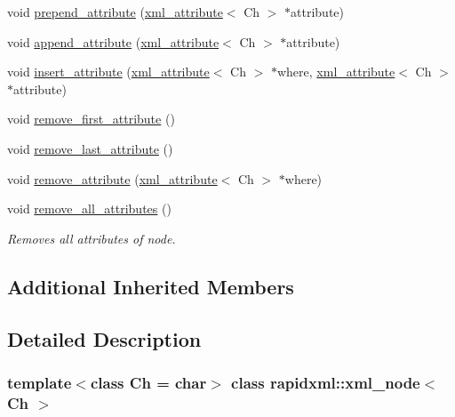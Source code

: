 \begin{DoxyCompactItemize}
void \mbox{\hyperlink{classrapidxml_1_1xml__node_a8b62ee76489faf8e2d1210869d547684}{prepend\+\_\+attribute}} (\mbox{\hyperlink{classrapidxml_1_1xml__attribute}{xml\+\_\+attribute}}$<$ Ch $>$ $\ast$attribute)
\item 
void \mbox{\hyperlink{classrapidxml_1_1xml__node_a33ce3386f8c42dd4db658b75cbb6e6c4}{append\+\_\+attribute}} (\mbox{\hyperlink{classrapidxml_1_1xml__attribute}{xml\+\_\+attribute}}$<$ Ch $>$ $\ast$attribute)
\item 
void \mbox{\hyperlink{classrapidxml_1_1xml__node_a9fe659cdf4a5b3bbf5e8ffc98db5a84f}{insert\+\_\+attribute}} (\mbox{\hyperlink{classrapidxml_1_1xml__attribute}{xml\+\_\+attribute}}$<$ Ch $>$ $\ast$where, \mbox{\hyperlink{classrapidxml_1_1xml__attribute}{xml\+\_\+attribute}}$<$ Ch $>$ $\ast$attribute)
\item 
void \mbox{\hyperlink{classrapidxml_1_1xml__node_aa95192d2a165cca16c551ed2a2a06aec}{remove\+\_\+first\+\_\+attribute}} ()
\item 
void \mbox{\hyperlink{classrapidxml_1_1xml__node_a1781a2cbedc9a51d609ad5b528125635}{remove\+\_\+last\+\_\+attribute}} ()
\item 
void \mbox{\hyperlink{classrapidxml_1_1xml__node_a6f97b1b4f46a94a4587915df3c0c6b57}{remove\+\_\+attribute}} (\mbox{\hyperlink{classrapidxml_1_1xml__attribute}{xml\+\_\+attribute}}$<$ Ch $>$ $\ast$where)
\item 
void \mbox{\hyperlink{classrapidxml_1_1xml__node_aa8d5d9484aa1eb5ff1841a073c84c1aa}{remove\+\_\+all\+\_\+attributes}} ()
\begin{DoxyCompactList}\small\item\em Removes all attributes of node. \end{DoxyCompactList}\end{DoxyCompactItemize}
\subsection*{Additional Inherited Members}


\subsection{Detailed Description}
\subsubsection*{template$<$class Ch = char$>$\newline
class rapidxml\+::xml\+\_\+node$<$ Ch $>$}

